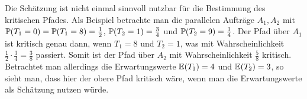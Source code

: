 Die Schätzung ist nicht einmal sinnvoll nutzbar für die Bestimmung des kritischen Pfades.
Als Beispiel betrachte man die parallelen Aufträge $A_1, A_2$ mit
$\mathbb{P}(T_1 = 0) = \mathbb{P}(T_1 = 8) = \frac{1}{2}$,
$\mathbb{P}(T_2 = 1) = \frac{3}{4}$ und $\mathbb{P}(T_2 = 9) = \frac{1}{4}$.
Der Pfad über $A_1$ ist kritisch genau dann, wenn $T_1 = 8$ und $T_2 = 1$, was mit
Wahrscheinlichkeit $\frac{1}{2} \cdot \frac{3}{4} = \frac{3}{8}$ passiert.
Somit ist der Pfad über $A_2$ mit Wahrscheinlichkeit $\frac{5}{8}$ kritisch.
Betrachtet man allerdings die Erwartungswerte $\mathbb{E}(T_1) = 4$ und $\mathbb{E}(T_2) = 3$,
so sieht man, dass hier der obere Pfad kritisch wäre, wenn man die Erwartungswerte als
Schätzung nutzen würde.

\pagebreak
